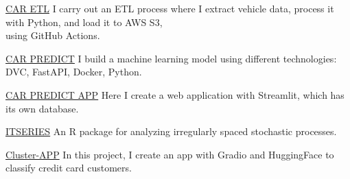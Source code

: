 {}
{\href{https://github.com/Wilmar3752/ETL_scraper}{CAR ETL}}
{I carry out an ETL process where I extract vehicle data, process it with Python, and load it to AWS S3,\\ using GitHub Actions.}
{\jbegin
\jend}

{}
{\href{https://github.com/Wilmar3752/car_predict}{CAR PREDICT}}
{I build a machine learning model using different technologies: DVC, FastAPI, Docker, Python.}
{\jbegin
\jend}

{}
{\href{https://github.com/Wilmar3752/car_predict}{CAR PREDICT APP}}
{Here I create a web application with Streamlit, which has its own database.}
{\jbegin
\jend}

{}
{\href{https://github.com/Wilmar3752/itseries}{ITSERIES}}
{An R package for analyzing irregularly spaced stochastic processes.}
{\jbegin
\jend}

{}
{\href{https://github.com/Wilmar3752/cluster-app}{Cluster-APP}}
{In this project, I create an app with Gradio and HuggingFace to classify credit card customers.}
{\jbegin
\jend}








